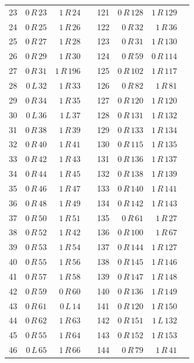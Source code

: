 \begin{longtable}{rrrrrrrr}
23 & $0\,R\,23$ & $1\,R\,24$ & & 121 & $0\,R\,128$ & $1\,R\,129$ &\\
24 & $0\,R\,25$ & $1\,R\,26$ & & 122 & $0\,R\,32$ & $1\,R\,36$ &\\
25 & $0\,R\,27$ & $1\,R\,28$ & & 123 & $0\,R\,31$ & $1\,R\,130$ &\\
26 & $0\,R\,29$ & $1\,R\,30$ & & 124 & $0\,R\,59$ & $0\,R\,114$ &\\
27 & $0\,R\,31$ & $1\,R\,196$ & & 125 & $0\,R\,102$ & $1\,R\,117$ &\\
28 & $0\,L\,32$ & $1\,R\,33$ & & 126 & $0\,R\,82$ & $1\,R\,81$ &\\
29 & $0\,R\,34$ & $1\,R\,35$ & & 127 & $0\,R\,120$ & $1\,R\,120$ &\\
30 & $0\,L\,36$ & $1\,L\,37$ & & 128 & $0\,R\,131$ & $1\,R\,132$ &\\
31 & $0\,R\,38$ & $1\,R\,39$ & & 129 & $0\,R\,133$ & $1\,R\,134$ &\\
32 & $0\,R\,40$ & $1\,R\,41$ & & 130 & $0\,R\,115$ & $1\,R\,135$ &\\
33 & $0\,R\,42$ & $1\,R\,43$ & & 131 & $0\,R\,136$ & $1\,R\,137$ &\\
34 & $0\,R\,44$ & $1\,R\,45$ & & 132 & $0\,R\,138$ & $1\,R\,139$ &\\
35 & $0\,R\,46$ & $1\,R\,47$ & & 133 & $0\,R\,140$ & $1\,R\,141$ &\\
36 & $0\,R\,48$ & $1\,R\,49$ & & 134 & $0\,R\,142$ & $1\,R\,143$ &\\
37 & $0\,R\,50$ & $1\,R\,51$ & & 135 & $0\,R\,61$ & $1\,R\,27$ &\\
38 & $0\,R\,52$ & $1\,R\,42$ & & 136 & $0\,R\,100$ & $1\,R\,67$ &\\
39 & $0\,R\,53$ & $1\,R\,54$ & & 137 & $0\,R\,144$ & $1\,R\,127$ &\\
40 & $0\,R\,55$ & $1\,R\,56$ & & 138 & $0\,R\,145$ & $1\,R\,146$ &\\
41 & $0\,R\,57$ & $1\,R\,58$ & & 139 & $0\,R\,147$ & $1\,R\,148$ &\\
42 & $0\,R\,59$ & $0\,R\,60$ & & 140 & $0\,R\,136$ & $1\,R\,149$ &\\
43 & $0\,R\,61$ & $0\,L\,14$ & & 141 & $0\,R\,120$ & $1\,R\,150$ &\\
44 & $0\,R\,62$ & $1\,R\,63$ & & 142 & $0\,R\,151$ & $1\,L\,132$ &\\
45 & $0\,R\,55$ & $1\,R\,64$ & & 143 & $0\,R\,152$ & $1\,R\,153$ &\\
46 & $0\,L\,65$ & $1\,R\,66$ & & 144 & $0\,R\,79$ & $1\,R\,41$ &\\

\end{longtable}
